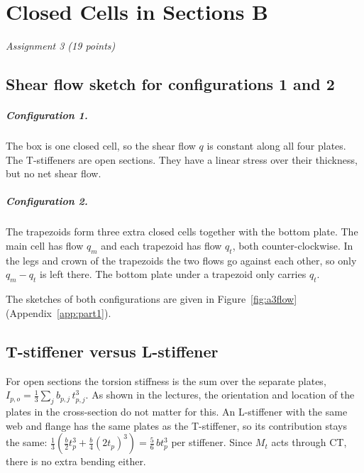 \chapter{Closed Cells in Sections B}
\label{ch:assignment3}

\begingroup\itshape Assignment 3 (19 points)\endgroup

\bigskip

\section{Shear flow sketch for configurations 1 and 2}
\label{sec:a3-1}

\paragraph{Configuration 1.}
The box is one closed cell, so the shear flow $q$ is constant along all four plates. The T-stiffeners are open sections. They have a linear stress over their thickness, but no net shear flow.

\paragraph{Configuration 2.}
The trapezoids form three extra closed cells together with the bottom plate. The main cell has flow $q_m$ and each trapezoid has flow $q_t$, both counter-clockwise. In the legs and crown of the trapezoids the two flows go against each other, so only $q_m - q_t$ is left there. The bottom plate under a trapezoid only carries $q_t$.

The sketches of both configurations are given in Figure~\ref{fig:a3flow} (Appendix~\ref{app:part1}).

\section{T-stiffener versus L-stiffener}
\label{sec:a3-2}

For open sections the torsion stiffness is the sum over the separate plates, $I_{p,o} = \frac13\sum_j b_{p,j}\,t_{p,j}^3$. As shown in the lectures, the orientation and location of the plates in the cross-section do not matter for this. An L-stiffener with the same web and flange has the same plates as the T-stiffener, so its contribution stays the same: $\frac13\left(\frac{b}{2}t_p^3 + \frac{b}{4}(2t_p)^3\right) = \frac56\,bt_p^3$ per stiffener. Since $M_t$ acts through CT, there is no extra bending either.

